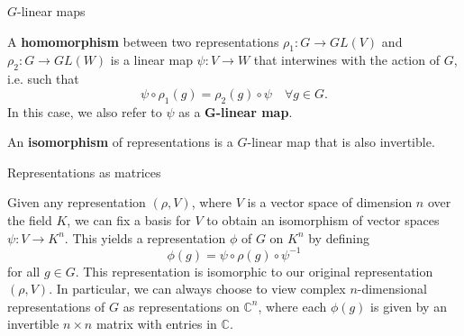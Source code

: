 \begin{frame}{$G$-linear maps}
\begin{definition}
A \textbf{homomorphism} between two representations $\rho_1 \colon G \to GL(V)$ and $\rho_2 \colon G \to GL(W)$ is a linear map $\psi \colon V \to W$ that interwines with the action of $G$, i.e. such that
\[ \psi \circ \rho_1 (g)= \rho_2(g) \circ \psi \quad \forall  g \in G. \]  
In this case, we also refer to $\psi$ as a $\mathbf{G}$\textbf{-linear map}.
\end{definition}
\begin{definition}
An \textbf{isomorphism} of representations is a $G$-linear map that is also invertible.
\end{definition}
\end{frame}

\begin{frame}{Representations as matrices}
\begin{example}
Given any representation $(\rho, V)$, where $V$ is a vector space of dimension $n$ over the field $K$, we can fix a basis for $V$ to obtain an isomorphism of vector spaces $\psi \colon V \to K^n$.  This yields a representation $\phi$ of $G$ on $K^n$ by defining \[\phi (g) = \psi \circ \rho(g) \circ \psi^{-1}\] for all $g \in G$. This representation is isomorphic to our original representation $(\rho, V)$. In particular, we can always choose to view complex $n$-dimensional representations of $G$ as representations on $\mathbb{C}^n$, where each $\phi(g)$ is given by an invertible $n \times n$ matrix with entries in $\mathbb{C}$.
\end{example}
\end{frame}


